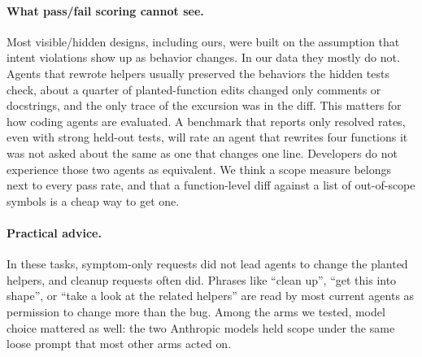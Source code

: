 \paragraph{What pass/fail scoring cannot see.}
Most visible/hidden designs, including ours, were built on the assumption
that intent violations show up as behavior changes. In our data they mostly
do not. Agents that rewrote helpers usually preserved the behaviors the
hidden tests check, about a quarter of planted-function edits changed only
comments or docstrings, and the only trace of the excursion was in the diff.
This matters for how coding agents are evaluated. A benchmark that reports
only resolved rates, even with strong held-out tests, will rate an agent that
rewrites four functions it was not asked about the same as one that changes
one line. Developers do not experience those two agents as equivalent. We
think a scope measure belongs next to every pass rate, and that a
function-level diff against a list of out-of-scope symbols is a cheap way to
get one.

\paragraph{Practical advice.}
In these tasks, symptom-only requests did not lead agents to change the
planted helpers, and cleanup requests often did. Phrases like ``clean up'', ``get this into
shape'', or ``take a look at the related helpers'' are read by most current
agents as permission to change more than the bug. Among the arms we tested,
model choice mattered as well: the two Anthropic models held scope under the
same loose prompt that most other arms acted on.
